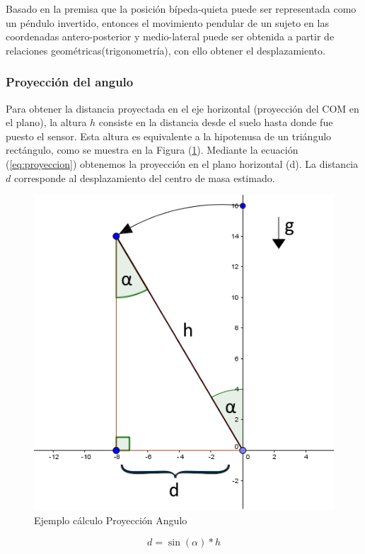 \documentclass[12pt,a4paper]{article}
\begin{document}
Basado en la premisa que la posición bípeda-quieta puede ser representada como un péndulo invertido\cite{gage_kinematic_2004}, entonces el movimiento pendular de un sujeto en las coordenadas antero-posterior y medio-lateral puede ser obtenida a partir de relaciones geométricas(trigonometría), con ello obtener el desplazamiento.


\subsubsection{Proyección del angulo}
Para obtener la distancia proyectada en el eje horizontal (proyección del COM en el plano), la altura $h$ consiste en la distancia desde el suelo hasta donde fue puesto el sensor. Esta altura es equivalente a la hipotenusa de un triángulo rectángulo, como se muestra en la Figura (\ref{fig:proyeccion}). Mediante la ecuación (\ref{eq:proyeccion}) obtenemos la proyección en el plano horizontal (d). La distancia $d$ corresponde al desplazamiento del centro de masa estimado.

\begin{figure}[H]
	\centering
	\includegraphics[scale=0.6]{images/calculoProyeccion}
	\caption{Ejemplo cálculo Proyección Angulo}
	\label{fig:proyeccion}
\end{figure}

\begin{equation}
	\label{eq:proyeccion}
	d=\sin(\alpha)*h
\end{equation}
\end{document}
